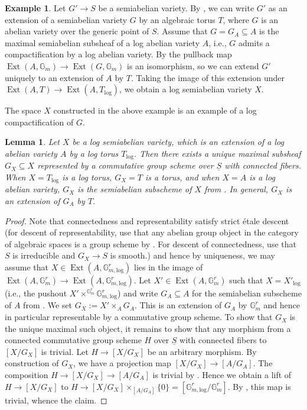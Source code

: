 \documentclass[11pt]{amsart}
\newtheorem{lemma}[theorem]{Lemma}
\theoremstyle{definition}
\newtheorem{example}[theorem]{Example}
\theoremstyle{remark}
\DeclareMathOperator{\Ext}{Ext}
\def\log{\mathrm{log}}
\begin{document}
\begin{example}
	\label{expl:log_cpt}
	Let $G'\to S$ be a semiabelian variety. By
	\cite[Proposition 2.9]{DegenerationOfFaltin1990}, we can
	write $G'$ as an extension of a semiabelian variety $G$
	by an algebraic torus $T$, where $G$ is an abelian variety
	over the generic point of $S$. Assume that $G=G_A\subseteq A$
	is the maximal semiabelian subsheaf of a log abelian variety $A$, i.e., $G$ admits a compactification
	by a log abelian variety. By \cite[Theorem 7.4 (2)]{LogarithmicAbeKajiwa2008}
	the pullback map $\Ext(A,\mathbb{G}_m)\to \Ext(G,\mathbb{G}_m)$
	is an isomorphism, so we can extend $G'$ uniquely to an
	extension of $A$ by $T$. Taking the image of this extension
	under $\Ext(A,T)\to \Ext(A,T_{\log})$,
	we obtain a log semiabelian variety $X$.
\end{example}

The space $X$ constructed in the above example is an example of
a log compactification of $G$.

\begin{lemma}
	Let $X$ be a log semiabelian variety, which is an extension of a log abelian variety $A$ by a log torus $T_{\log}$. Then there exists a unique
	maximal subsheaf $G_X\subseteq X$ represented by a commutative
	group scheme over $\underline{S}$ with connected fibers. When $X = T_{\log}$ is a log torus, $G_X = T$ is a torus, and when $X=A$ is a log abelian variety, $G_X$ is the semiabelian subscheme of $X$
	from \cite[4.4]{LogarithmicAbeKajiwa2008}. In general, $G_X$ is an extension of $G_A$ by $T$.
\end{lemma}

\begin{proof}
	Note that connectedness and representability satisfy strict étale descent (for descent of representability, use that any
	abelian group object in the category of algebraic spaces is a group scheme by \cite[Theorem 1.9]{DegenerationOfFaltin1990}.
	For descent of connectedness, use that $S$ is irreducible and $G_X\to S$ is smooth.) and hence
	by uniqueness, we may assume that $X\in \Ext(A,\mathbb{G}_{m,\log}^{r})$ lies in the image of
	$\Ext(A,\mathbb{G}_{m}^{r})\to \Ext(A,\mathbb{G}_{m,\log}^{r})$. Let $X'\in \Ext(A,\mathbb{G}_{m}^{r})$
	such that $X=X'_{\log}$ (i.e., the pushout $X'\times^{\mathbb{G}_m^r}\mathbb{G}_{m,\log}^{r}$) and write $G_A\subseteq A$ for the semiabelian subscheme of $A$
	from \cite[4.4]{LogarithmicAbeKajiwa2008}. We set $G_X:=X'\times_{A}G_A$. This is an extension
	of $G_A$ by $\mathbb{G}_m^{r}$ and hence in particular representable by a commutative group scheme.
	To show that $G_X$ is the unique maximal such object, it remains to show that any morphism from
	a connected commutative group scheme $H$ over $\underline{S}$ with connected fibers to $[X/G_X]$ is trivial. Let $H\to [X/G_X]$
	be an arbitrary morphism. By construction of $G_X$, we have a projection map $[X/G_X]\to [A/G_A]$. The
	composition $H\to [X/G_X]\to [A/G_A]$ is trivial by \cite[9.2]{LogarithmicAbeKajiwa2008}. Hence we
	obtain a lift of $H\to [X/G_X]$ to $H\to [X/G_X]\times_{[A/G_A]}\{0\}=[\mathbb{G}_{m,\log}^{r}/\mathbb{G}_{m}^{r}]$.
	By \cite[Lemma 6.1.1]{LogarithmicAbeKajiwa2008}, this map is trivial, whence the claim.
\end{proof}
\end{document}
